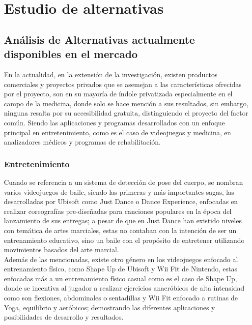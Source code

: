 \chapter{Estudio de alternativas}

\section{Análisis de Alternativas actualmente disponibles en el mercado}

En la actualidad, en la extensión de la investigación, existen productos comerciales y proyectos privados que se asemejan a las características ofrecidas por el proyecto, son en su mayoría de índole privatizada especialmente en el campo de la medicina, donde solo se hace mención a sus resultados, sin embargo, ninguna resalta por su accesibilidad gratuita, distinguiendo el proyecto del factor común. Siendo las aplicaciones y programas desarrollados con un enfoque principal en entretenimiento, como es el caso de videojuegos y medicina, en analizadores médicos y programas de rehabilitación.\\

\subsection{Entretenimiento}

Cuando se referencia a un sistema de detección de pose del cuerpo, se nombran varios videojuegos de baile, siendo las primeras y más importantes sagas, las desarrolladas por Ubisoft como Just Dance o Dance Experience, enfocadas en realizar coreografías pre-diseñadas para canciones populares en la época del lanzamiento de sus entregas; a pesar de que en Just Dance han existido niveles con temática de artes marciales, estas no contaban con la intención de ser un entrenamiento educativo, sino un baile con el propósito de entretener utilizando movimientos basados del arte marcial.  \\

Además de las mencionadas, existe otro género en los videojuegos enfocado al entrenamiento físico, como Shape Up de Ubisoft y Wii Fit de Nintendo, estas enfocadas más a un entrenamiento físico casual como es el caso de Shape Up, donde se incentiva al jugador a realizar ejercicios anaeróbicos de alta intensidad como son flexiones, abdominales o sentadillas y Wii Fit enfocado a rutinas de Yoga, equilibrio y aeróbicos; demostrando las diferentes aplicaciones y posibilidades de desarrollo y resultados. \\

